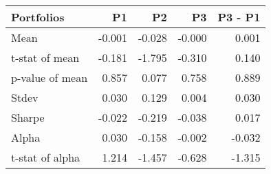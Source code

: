 \begin{tabular}{lrrrr}
\toprule
Portfolios & P1 & P2 & P3 & P3 - P1 \\
\midrule
Mean & -0.001 & -0.028 & -0.000 & 0.001 \\
t-stat of mean & -0.181 & -1.795 & -0.310 & 0.140 \\
p-value of mean & 0.857 & 0.077 & 0.758 & 0.889 \\
Stdev & 0.030 & 0.129 & 0.004 & 0.030 \\
Sharpe & -0.022 & -0.219 & -0.038 & 0.017 \\
Alpha & 0.030 & -0.158 & -0.002 & -0.032 \\
t-stat of alpha & 1.214 & -1.457 & -0.628 & -1.315 \\
\bottomrule
\end{tabular}
